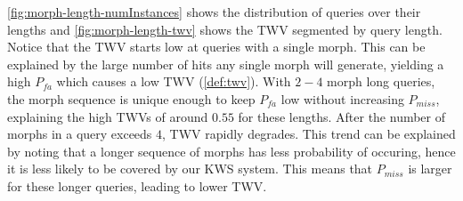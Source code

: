 \documentclass[a4paper,oneside,reqno]{amsart}
\begin{document}
\autoref{fig:morph-length-numInstances} shows the distribution of queries
over their lengths and \autoref{fig:morph-length-twv} shows the TWV segmented
by query length. Notice that the TWV starts low at queries with a single morph.
This can be explained by the large number of hits any single morph will generate, yielding
a high $P_{fa}$ which causes a low TWV (\autoref{def:twv}).
With $2-4$ morph long queries, the morph sequence is unique enough to keep $P_{fa}$ low
without increasing $P_{miss}$, explaining the high TWVs of around $0.55$ for these lengths.
After the number of morphs in a query exceeds $4$, TWV rapidly degrades. This trend
can be explained by noting that a longer sequence of morphs has less probability of
occuring, hence it is less likely to be covered by our KWS system. This means that $P_{miss}$
is larger for these longer queries, leading to lower TWV.
\end{document}
